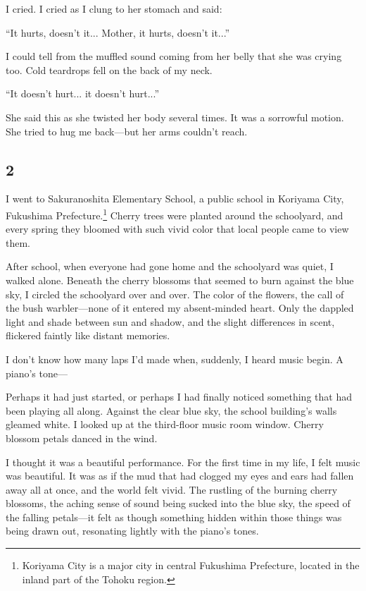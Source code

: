 \documentclass[
    a4paper,
    12pt,
    twoside,
    openany,
    UTF8,
    fontset=windows
]{ctexbook}
\begin{document}
I cried. I cried as I clung to her stomach and said:

``It hurts, doesn't it... Mother, it hurts, doesn't it...''

I could tell from the muffled sound coming from her belly that she was crying too. Cold teardrops fell on the back of my neck.

``It doesn't hurt... it doesn't hurt...''

She said this as she twisted her body several times. It was a sorrowful motion. She tried to hug me back---but her arms couldn't reach.


\subsection*{2}

I went to Sakuranoshita Elementary School, a public school in Koriyama City, Fukushima Prefecture.\footnote{Koriyama City is a major city in central Fukushima Prefecture, located in the inland part of the Tohoku region.} Cherry trees were planted around the schoolyard, and every spring they bloomed with such vivid color that local people came to view them.

After school, when everyone had gone home and the schoolyard was quiet, I walked alone. Beneath the cherry blossoms that seemed to burn against the blue sky, I circled the schoolyard over and over. The color of the flowers, the call of the bush warbler---none of it entered my absent-minded heart. Only the dappled light and shade between sun and shadow, and the slight differences in scent, flickered faintly like distant memories.

I don't know how many laps I'd made when, suddenly, I heard music begin. A piano's tone---

Perhaps it had just started, or perhaps I had finally noticed something that had been playing all along. Against the clear blue sky, the school building's walls gleamed white. I looked up at the third-floor music room window. Cherry blossom petals danced in the wind.

I thought it was a beautiful performance. For the first time in my life, I felt music was beautiful. It was as if the mud that had clogged my eyes and ears had fallen away all at once, and the world felt vivid. The rustling of the burning cherry blossoms, the aching sense of sound being sucked into the blue sky, the speed of the falling petals---it felt as though something hidden within those things was being drawn out, resonating lightly with the piano's tones.
\end{document}
